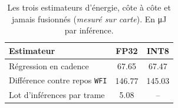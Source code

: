 \begin{table}[htbp]
\centering
\caption{Les trois estimateurs d'énergie, côte à côte et jamais fusionnés (\emph{mesuré sur carte}). En \si{\micro\joule} par inférence.}
\label{tab:annex-energy}
\begin{tabular}{lcc}
\toprule
Estimateur & FP32 & INT8 \\
\midrule
Régression en cadence & \num{67.65} & \num{67.47} \\
Différence contre repos \texttt{WFI} & \num{146.77} & \num{145.03} \\
Lot d'inférences par trame & \num{5.08} & -- \\
\bottomrule
\end{tabular}
\end{table}
